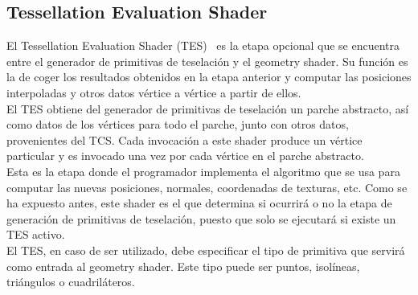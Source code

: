 \subsection{Tessellation Evaluation Shader}
\label{ref:TesEvaShader}

El Tessellation Evaluation Shader (TES)~\cite{TesEvaShader} es la etapa opcional
que se encuentra entre el generador de primitivas de teselación y el geometry
shader. Su función es la de coger los resultados obtenidos en la etapa anterior
y computar las posiciones interpoladas y otros datos vértice a vértice a partir
de ellos.\\

El TES obtiene del generador de primitivas de teselación un parche abstracto,
así como datos de los vértices para todo el parche, junto con otros datos,
provenientes del TCS. Cada invocación a este shader produce un vértice
particular y es invocado una vez por cada vértice en el parche abstracto.\\

Esta es la etapa donde el programador implementa el algoritmo que se usa para
computar las nuevas posiciones, normales, coordenadas de texturas, etc. Como se
ha expuesto antes, este shader es el que determina si ocurrirá o no la etapa de
generación de primitivas de teselación, puesto que solo se ejecutará si existe
un TES activo.\\

El TES, en caso de ser utilizado, debe especificar el tipo de primitiva que
servirá como entrada al geometry shader. Este tipo puede ser puntos, isolíneas,
triángulos o cuadriláteros.


